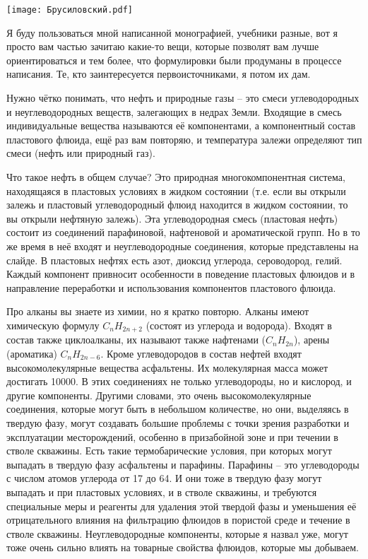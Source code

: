 \documentclass[main.tex]{subfiles}
\begin{document}
\begin{center}
\texttt{[image: Брусиловский.pdf]}
\end{center}

Я буду пользоваться мной написанной монографией, учебники разные, вот я просто вам частью зачитаю какие-то вещи, которые позволят вам лучше ориентироваться и тем более, что формулировки были продуманы в процессе написания.
Те, кто заинтересуется первоисточниками, я потом их дам.

Нужно чётко понимать, что нефть и природные газы -- это смеси углеводородных и неуглеводородных веществ, залегающих в недрах Земли.
Входящие в смесь индивидуальные вещества называются её компонентами, а компонентный состав пластового флюида, ещё раз вам повторяю, и температура залежи определяют тип смеси (нефть или природный газ).

Что такое нефть в общем случае?
Это природная многокомпонентная система, находящаяся в пластовых условиях в жидком состоянии (т.е. если вы открыли залежь и пластовый углеводородный флюид находится в жидком состоянии, то вы открыли нефтяную залежь).
Эта углеводородная смесь (пластовая нефть) состоит из соединений парафиновой, нафтеновой и ароматической групп.
Но в то же время в неё входят и неуглеводородные соединения, которые представлены на слайде.
В пластовых нефтях есть азот, диоксид углерода, сероводород, гелий.
Каждый компонент привносит особенности в поведение пластовых флюидов и в направление переработки и использования компонентов пластового флюида.

Про алканы вы знаете из химии, но я кратко повторю.
Алканы имеют химическую формулу $C_nH_{2n+2}$ (состоят из углерода и водорода).
Входят в состав также циклоалканы, их называют также нафтенами ($C_nH_{2n}$), арены (ароматика) $C_nH_{2n-6}$.
Кроме углеводородов в состав нефтей входят высокомолекулярные вещества асфальтены.
Их молекулярная масса может достигать 10000.
В этих соединениях не только углеводороды, но и кислород, и другие компоненты.
Другими словами, это очень высокомолекулярные соединения, которые могут быть в небольшом количестве, но они, выделяясь в твердую фазу, могут создавать большие проблемы с точки зрения разработки и эксплуатации месторождений, особенно в призабойной зоне и при течении в стволе скважины.
Есть такие термобарические условия, при которых могут выпадать в твердую фазу асфальтены и парафины.
Парафины -- это углеводороды с числом атомов углерода от 17 до 64.
И они тоже в твердую фазу могут выпадать и при пластовых условиях, и в стволе скважины, и требуются специальные меры и реагенты для удаления этой твердой фазы и уменьшения её отрицательного влияния на фильтрацию флюидов в пористой среде и течение в стволе скважины.
Неуглеводородные компоненты, которые я назвал уже, могут тоже очень сильно влиять на товарные свойства флюидов, которые мы добываем.
\end{document}
